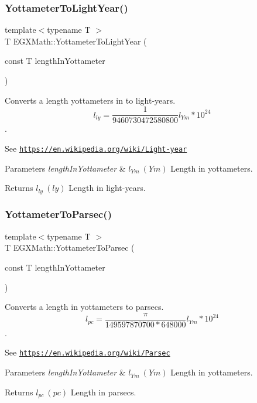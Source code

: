 \subsubsection{\texorpdfstring{Yottameter\+To\+Light\+Year()}{YottameterToLightYear()}}
{\footnotesize\ttfamily template$<$typename T $>$ \\
T E\+G\+X\+Math\+::\+Yottameter\+To\+Light\+Year (\begin{DoxyParamCaption}\item[{const T}]{length\+In\+Yottameter }\end{DoxyParamCaption})}



Converts a length yottameters in to light-\/years. \[ l_{ly}= \frac{1}{9460730472580800} l_{Ym} * 10^{24} \]. 

See \href{https://en.wikipedia.org/wiki/Light-year}{\tt https\+://en.\+wikipedia.\+org/wiki/\+Light-\/year} 
\begin{DoxyParams}{Parameters}
{\em length\+In\+Yottameter} & $ l_{Ym}\ (Ym)$ Length in yottameters. \\
\hline
\end{DoxyParams}
\begin{DoxyReturn}{Returns}
$ l_{ly}\ (ly)$ Length in light-\/years. 
\end{DoxyReturn}
\mbox{\label{group___e_g_x_math-_conversions-_length_conversions-_s_i-_yottameter-_astronomical_gadcada2ea03efbd6c010a780b87daf01f}} 
\subsubsection{\texorpdfstring{Yottameter\+To\+Parsec()}{YottameterToParsec()}}
{\footnotesize\ttfamily template$<$typename T $>$ \\
T E\+G\+X\+Math\+::\+Yottameter\+To\+Parsec (\begin{DoxyParamCaption}\item[{const T}]{length\+In\+Yottameter }\end{DoxyParamCaption})}



Converts a length in yottameters to parsecs. \[ l_{pc}=\frac{\pi}{149597870700 * 648000} l_{Ym} * 10^{24} \]. 

See \href{https://en.wikipedia.org/wiki/Parsec}{\tt https\+://en.\+wikipedia.\+org/wiki/\+Parsec} 
\begin{DoxyParams}{Parameters}
{\em length\+In\+Yottameter} & $ l_{Ym}\ (Ym)$ Length in yottameters. \\
\hline
\end{DoxyParams}
\begin{DoxyReturn}{Returns}
$ l_{pc}\ (pc)$ Length in parsecs. 
\end{DoxyReturn}
